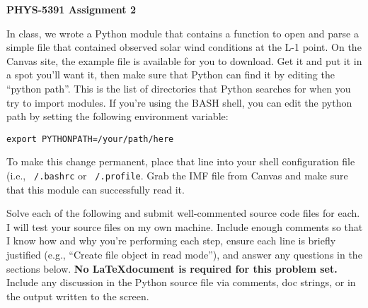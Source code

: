 \documentclass[12pt, letterpaper]{article}
\begin{document}
\begin{center}
  {\LARGE \textbf{PHYS-5391 Assignment 2}}\\
\end{center}

\vspace{0.5cm}

In class, we wrote a Python module that contains a function to open and parse
a simple file that contained observed solar wind conditions at the L-1 point.
On the Canvas site, the example file is available for you to download.
Get it and put it in a spot you'll want it, then
make sure that Python can find it by editing the ``python path''.  This is
the list of directories that Python searches for when you try to import
modules.  If you're using the BASH shell, you can edit the python path
by setting the following environment variable:
\begin{verbatim}
export PYTHONPATH=/your/path/here
\end{verbatim}
To make this change permanent, place that line into your shell configuration
file (i.e., {\tt ~/.bashrc} or {\tt ~/.profile}.  Grab the IMF file from Canvas
and make sure that this module can successfully read it.

Solve each of the following and submit well-commented source code files for
each.  I will test your source files on my own machine.  Include enough 
comments so that I know how and why you're performing each step, 
ensure each line is briefly justified (e.g., ``Create file object in read
mode''), and answer any questions in the sections below.
\textbf{No \LaTeX document is required for this problem set.}  Include any
discussion in the Python source file via comments, doc strings, or in the
output written to the screen.
\end{document}
